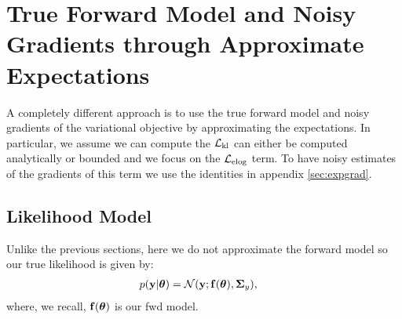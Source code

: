 \section{True Forward Model and Noisy Gradients through Approximate Expectations}
A completely different approach is to use the true forward model and  noisy gradients of the variational objective by approximating 
the expectations. In particular, we assume we can compute the $\mathcal{L}_{\text{{kl}}}$ can either be computed analytically or bounded and we focus on 
the $\mathcal{L}_{\text{{elog}}}$ term. To have noisy estimates of the gradients of this term we use the identities in appendix \ref{sec:expgrad}.
\subsection{Likelihood Model}
Unlike the previous sections, here we do not approximate the forward model so our true likelihood is given by:
\begin{align}
	p(\mathbf{y} | \boldsymbol{ \theta }) &= \mathcal{N}(\mathbf{y}; \mathbf{f}(\boldsymbol{ \theta }), \mathbf{\Sigma}_{y}) \text{,}
\end{align}	
where, we recall, $\mathbf{f}(\boldsymbol{ \theta })$ is our fwd model.
